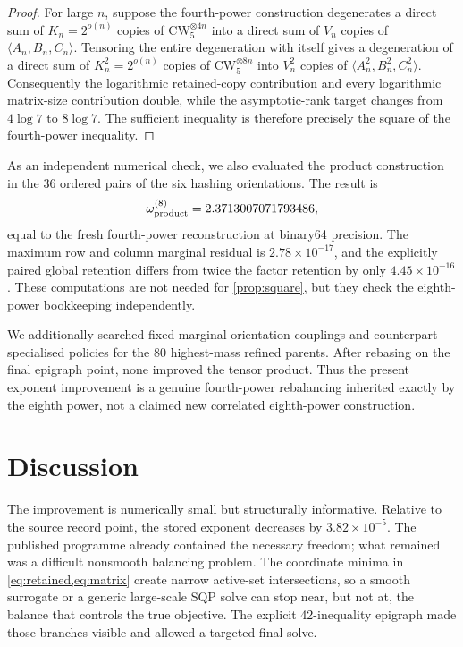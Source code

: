 \documentclass[11pt,reqno]{amsart}
\theoremstyle{definition}
\theoremstyle{remark}
\newcommand{\CW}{\mathrm{CW}}
\begin{document}
\begin{proof}
For large $n$, suppose the fourth-power construction degenerates a direct sum of
$K_n=2^{o(n)}$ copies of $\CW_5^{\otimes4n}$ into a direct sum of $V_n$ copies of
$\langle A_n,B_n,C_n\rangle$.  Tensoring the entire degeneration with itself gives a degeneration of a
direct sum of $K_n^2=2^{o(n)}$ copies of $\CW_5^{\otimes8n}$ into $V_n^2$ copies of
$\langle A_n^2,B_n^2,C_n^2\rangle$.  Consequently the logarithmic retained-copy contribution and every
logarithmic matrix-size contribution double, while the asymptotic-rank target changes from $4\log7$ to
$8\log7$.  The sufficient inequality is therefore precisely the square of the fourth-power inequality.
\end{proof}

As an independent numerical check, we also evaluated the product construction in the 36 ordered pairs of
the six hashing orientations.  The result is
\[
  \omega^{(8)}_{\rm product}=2.3713007071793486,
\]
equal to the fresh fourth-power reconstruction at binary64 precision.  The maximum row and column
marginal residual is $2.78\times10^{-17}$, and the explicitly paired global retention differs from twice
the factor retention by only $4.45\times10^{-16}$.  These computations are not needed for
\cref{prop:square}, but they check the eighth-power bookkeeping independently.

We additionally searched fixed-marginal orientation couplings and counterpart-specialised policies for the
80 highest-mass refined parents.  After rebasing on the final epigraph point, none improved the tensor
product.  Thus the present exponent improvement is a genuine fourth-power rebalancing inherited exactly
by the eighth power, not a claimed new correlated eighth-power construction.

\section{Discussion}

The improvement is numerically small but structurally informative.  Relative to the source record point,
the stored exponent decreases by $3.82\times10^{-5}$.  The published programme already contained the
necessary freedom; what remained was a difficult nonsmooth balancing problem.  The
coordinate minima in \cref{eq:retained,eq:matrix} create narrow active-set intersections, so a smooth
surrogate or a generic large-scale SQP solve can stop near, but not at, the balance that controls the true
objective.  The explicit 42-inequality epigraph made those branches visible and allowed a targeted final
solve.
\end{document}
